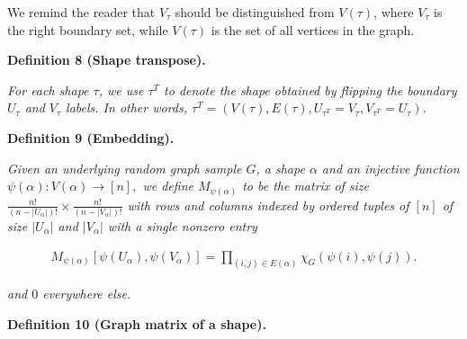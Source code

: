 We remind the reader that $V_{\tau}$ should be distinguished from $V(\tau)$, where $V_{\tau}$ is the right boundary set, while $V(\tau)$ is the set of all vertices in the graph.\par





\par\medskip\noindent\textbf{
\textbf{Definition 8}\textbf{ }(Shape transpose)\textbf{.}
}\par



\emph{For each shape $\tau$, we use $\tau^{T}$ to denote the shape obtained by flipping the boundary $U_{\tau}$ and $V_{\tau}$ labels. In other words, $\tau^{T}=(V(\tau),E(\tau),U_{\tau^{T}}=V_{\tau},V_{\tau^{T}}=U_{\tau})$.}\par







\par\medskip\noindent\textbf{
\textbf{Definition 9}\textbf{ }(Embedding)\textbf{.}
}\par



\emph{Given an underlying random graph sample $G$, a shape $\alpha$ and an injective function $\psi(\alpha):V(\alpha)\to[n],$ we define $M_{\psi(\alpha)}$ to be the matrix of size
$\frac{n!}{(n-|U_{\alpha}|)!}\times\frac{n!}{(n-|V_{\alpha}|)!}$
with rows and columns indexed by ordered tuples of $[n]$ of size $|U_{\alpha}|$ and $|V_{\alpha}|$ with a single nonzero entry}\par


\[\begin{gathered}
M_{\psi(\alpha)}[\psi(U_{\alpha}),\psi(V_{\alpha})]=\prod_{(i,j)\in E(\alpha)}\chi_{G}\left(\psi(i),\psi(j)\right).
\end{gathered}\]


\emph{and $0$ everywhere else.}\par







\par\medskip\noindent\textbf{
\textbf{Definition 10}\textbf{ }(Graph matrix of a shape)\textbf{.}
}\par



